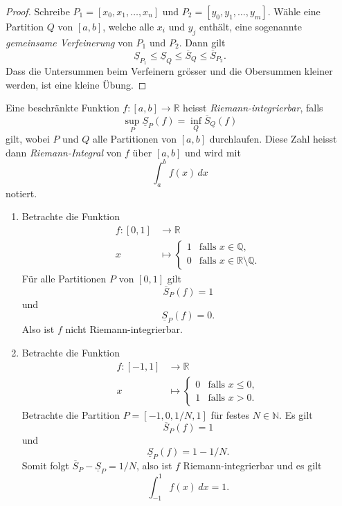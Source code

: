 \documentclass[../main.tex]{subfiles}
\begin{document}
\begin{proof}
  Schreibe
  $P_1 = [x_0, x_1, \dots, x_n]$ 
  und
  $P_2 = [y_0, y_1, \dots, y_m]$.
  Wähle eine Partition $Q$ von
  $[a,b]$, welche alle $x_i$ und
  $y_j$ enthält, eine sogenannte
  \emph{gemeinsame Verfeinerung}
  von $P_1$ und $P_2$.
  Dann gilt
  \[
    \underline S_{P_1} \leq \underline S_Q
    \leq \overline S_Q
    \leq \overline S_{P_2}.
  \]
  Dass die Untersummen beim Verfeinern
  grösser und die Obersummen kleiner
  werden, ist eine kleine Übung.
\end{proof}

\begin{definition}
  Eine beschränkte Funktion
  $f \colon [a, b] \to \mathbb{R}$ heisst
  \emph{Riemann-integrierbar}, falls
  \[
    \sup_{P} \underline S_P(f) = \inf_{Q} \overline S_Q(f)
  \]
  gilt,
  wobei $P$ und $Q$ alle Partitionen von
  $[a, b]$ durchlaufen.
  Diese Zahl heisst dann \emph{Riemann-Integral}
  von $f$ über $[a,b]$ und wird
  mit
  \[
    \int_{a}^{b} f(x) \, dx
  \]
  notiert.
\end{definition}

\begin{examples}
  \leavevmode
  \begin{enumerate}[(1)]
    \item Betrachte die Funktion
      \begin{align*}
        f \colon [0, 1] & \to \mathbb{R} \\
        x & \mapsto 
        \begin{cases}
          1 & \text{falls $x \in \mathbb{Q}$},\\
          0 & \text{falls $x \in \mathbb{R} \setminus \mathbb{Q}$}.
        \end{cases}
      \end{align*}
      Für alle Partitionen $P$ von $[0, 1]$ gilt
      \[
        \overline S_P(f) = 1
      \]
      und
      \[
        \underline S_P(f) = 0.
      \]
      Also ist $f$ nicht Riemann-integrierbar.
    \item Betrachte die Funktion
      \begin{align*}
        f \colon [-1, 1] & \to \mathbb{R} \\
        x & \mapsto 
        \begin{cases}
          0 & \text{falls $x \leq 0$},\\
          1 & \text{falls $x > 0$}.
        \end{cases}
      \end{align*}
      Betrachte die Partition
      $P = [-1, 0, 1/N, 1]$ für festes $N \in \mathbb{N}$.
      Es gilt
      \[
        \overline S_P(f) = 1
      \]
      und
      \[
        \underline S_P(f) = 1 - 1/N.
      \] 
      Somit folgt $\overline S_P - \underline S_P = 1/N$,
      also ist $f$ Riemann-integrierbar und es gilt
      \[
        \int_{-1}^{1} f(x) \, dx = 1.
      \]
  \end{enumerate}
\end{examples}
\end{document}
